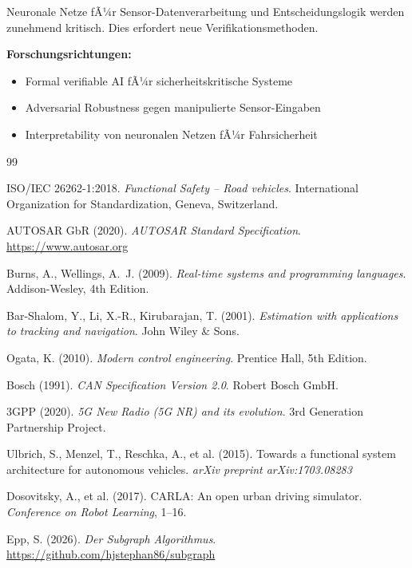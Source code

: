 ﻿\documentclass[a4paper,12pt]{article}
\begin{document}
Neuronale Netze fÃ¼r Sensor-Datenverarbeitung und Entscheidungslogik werden zunehmend 
kritisch. Dies erfordert neue Verifikationsmethoden.

\textbf{Forschungsrichtungen:}
\begin{itemize}
	\item Formal verifiable AI fÃ¼r sicherheitskritische Systeme
	\item Adversarial Robustness gegen manipulierte Sensor-Eingaben
	\item Interpretability von neuronalen Netzen fÃ¼r Fahrsicherheit
\end{itemize}


\begin{thebibliography}{99}

ISO/IEC 26262-1:2018. \emph{Functional Safety -- Road vehicles}.
International Organization for Standardization, Geneva, Switzerland.

AUTOSAR GbR (2020). \emph{AUTOSAR Standard Specification}. 
\url{https://www.autosar.org}

Burns, A., Wellings, A.~J. (2009). \emph{Real-time systems and programming languages}. 
Addison-Wesley, 4th Edition.

Bar-Shalom, Y., Li, X.-R., Kirubarajan, T. (2001). \emph{Estimation with applications 
to tracking and navigation}. John Wiley \& Sons.

Ogata, K. (2010). \emph{Modern control engineering}. Prentice Hall, 5th Edition.

Bosch (1991). \emph{CAN Specification Version 2.0}. Robert Bosch GmbH.

3GPP (2020). \emph{5G New Radio (5G NR) and its evolution}. 
3rd Generation Partnership Project.

Ulbrich, S., Menzel, T., Reschka, A., et al. (2015). 
Towards a functional system architecture for autonomous vehicles. 
\emph{arXiv preprint arXiv:1703.08283}

Dosovitsky, A., et al. (2017). 
CARLA: An open urban driving simulator. 
\emph{Conference on Robot Learning}, 1--16.

Epp, S. (2026). \emph{Der Subgraph Algorithmus}. 
\url{https://github.com/hjstephan86/subgraph}

\end{thebibliography}
\end{document}
